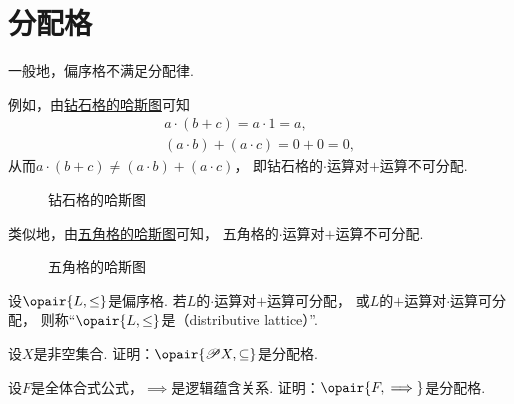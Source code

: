 \section{分配格}
一般地，偏序格不满足分配律.

例如，由\hyperref[figure:格论.偏序集2]{钻石格的哈斯图}可知\begin{gather*}
	a \cdot (b + c) = a \cdot 1 = a, \\
	(a \cdot b) + (a \cdot c) = 0 + 0 = 0,
\end{gather*}
从而\(a \cdot (b + c) \neq (a \cdot b) + (a \cdot c)\)，
即钻石格的\(\cdot\)运算对\(+\)运算不可分配.

\begin{figure}[hbt]
	\centering
	\caption{钻石格的哈斯图}
	\label{figure:格论.偏序集2}
\end{figure}

类似地，由\hyperref[figure:格论.偏序集3]{五角格的哈斯图}可知，
五角格的\(\cdot\)运算对\(+\)运算不可分配.

\begin{figure}[hbt]
	\centering
	\caption{五角格的哈斯图}
	\label{figure:格论.偏序集3}
\end{figure}

\begin{definition}
设\(\opair{L,\leq}\)是偏序格.
若\(L\)的\(\cdot\)运算对\(+\)运算可分配，
或\(L\)的\(+\)运算对\(\cdot\)运算可分配，
则称“\(\opair{L,\leq}\)是（distributive lattice）”.
\end{definition}

\begin{example}
设\(X\)是非空集合.
证明：\(\opair{\Powerset X,\subseteq}\)是分配格.
\end{example}

\begin{example}
设\(F\)是全体合式公式，\(\implies\)是逻辑蕴含关系.
证明：\(\opair{F,\implies}\)是分配格.
\end{example}
